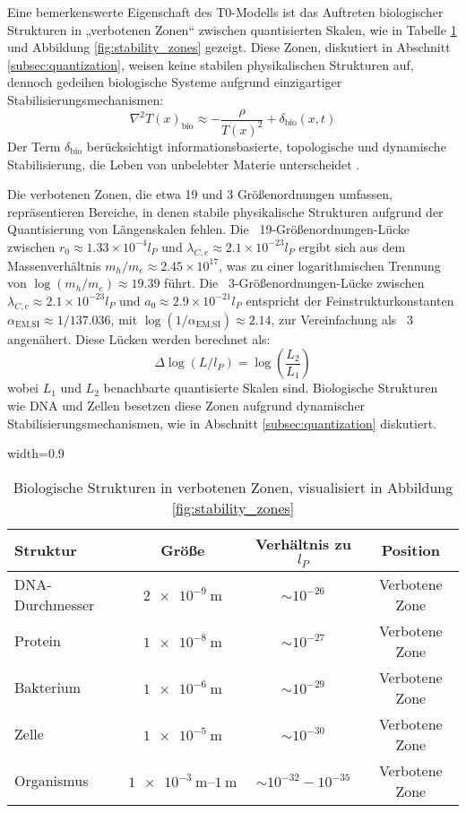\documentclass[12pt,a4paper]{article}
\newcommand{\Tfield}{T(x)}
\newcommand{\tablescale}{0.9}
\begin{document}
	Eine bemerkenswerte Eigenschaft des T0-Modells ist das Auftreten biologischer Strukturen in „verbotenen Zonen“ zwischen quantisierten Skalen, wie in Tabelle \ref{tab:bio_anomalies} und Abbildung \ref{fig:stability_zones} gezeigt. Diese Zonen, diskutiert in Abschnitt \ref{subsec:quantization}, weisen keine stabilen physikalischen Strukturen auf, dennoch gedeihen biologische Systeme aufgrund einzigartiger Stabilisierungsmechanismen:
	\[
	\nabla^2 \Tfield_{\text{bio}} \approx -\frac{\rho}{\Tfield^2} + \delta_{\text{bio}}(x,t)
	\]
	Der Term \(\delta_{\text{bio}}\) berücksichtigt informationsbasierte, topologische und dynamische Stabilisierung, die Leben von unbelebter Materie unterscheidet \cite{pascher_dualismus_2025}.
	
	Die verbotenen Zonen, die etwa 19 und 3 Größenordnungen umfassen, repräsentieren Bereiche, in denen stabile physikalische Strukturen aufgrund der Quantisierung von Längenskalen fehlen. Die ~19-Größenordnungen-Lücke zwischen \( r_0 \approx 1.33 \times 10^{-4} l_P \) und \( \lambda_{C,e} \approx 2.1 \times 10^{-23} l_P \) ergibt sich aus dem Massenverhältnis \( m_h / m_e \approx 2.45 \times 10^{17} \), was zu einer logarithmischen Trennung von \( \log(m_h / m_e) \approx 19.39 \) führt. Die ~3-Größenordnungen-Lücke zwischen \( \lambda_{C,e} \approx 2.1 \times 10^{-23} l_P \) und \( a_0 \approx 2.9 \times 10^{-21} l_P \) entspricht der Feinstrukturkonstanten \( \alpha_{\text{EM,SI}} \approx 1/137.036 \), mit \( \log(1 / \alpha_{\text{EM,SI}}) \approx 2.14 \), zur Vereinfachung als ~3 angenähert. Diese Lücken werden berechnet als:
	\[
	\Delta \log(L / l_P) = \log\left(\frac{L_2}{L_1}\right)
	\]
	wobei \( L_1 \) und \( L_2 \) benachbarte quantisierte Skalen sind. Biologische Strukturen wie DNA und Zellen besetzen diese Zonen aufgrund dynamischer Stabilisierungsmechanismen, wie in Abschnitt \ref{subsec:quantization} diskutiert.
	
	\begin{table}[htbp]
		\centering
		\begin{adjustbox}{width=\tablescale\textwidth}
			\begin{tabular}{lccc}
				\toprule
				\textbf{Struktur} & \textbf{Größe} & \textbf{Verhältnis zu \(l_P\)} & \textbf{Position} \\
				\midrule
				DNA-Durchmesser & \(\SI{2e-9}{\meter}\) & \(\sim 10^{-26}\) & Verbotene Zone \\
				Protein & \(\SI{1e-8}{\meter}\) & \(\sim 10^{-27}\) & Verbotene Zone \\
				Bakterium & \(\SI{1e-6}{\meter}\) & \(\sim 10^{-29}\) & Verbotene Zone \\
				Zelle & \(\SI{1e-5}{\meter}\) & \(\sim 10^{-30}\) & Verbotene Zone \\
				Organismus & \(\SIrange{1e-3}{1}{\meter}\) & \(\sim 10^{-32} - 10^{-35}\) & Verbotene Zone \\
				\bottomrule
			\end{tabular}
		\end{adjustbox}
		\caption{Biologische Strukturen in verbotenen Zonen, visualisiert in Abbildung \ref{fig:stability_zones}}
		\label{tab:bio_anomalies}
	\end{table}
	
\end{document}
